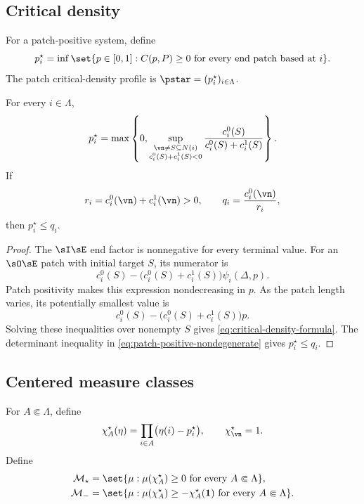 \subsection{Critical density}

\begin{definition}
\label{def:critical-profile}
For a patch-positive system, define
\[
  p_i^\star
  =
  \inf\set{
    p\in[0,1]:
    C(p,P)\ge0
    \text{ for every end patch based at }i
  }.
\]
The patch critical-density profile is
\(\pstar=(p_i^\star)_{i\in\Lambda}\).
\end{definition}

\begin{proposition}
\label{prop:critical-density-formula}
For every \(i\in\Lambda\),
\begin{equation}
  p_i^\star
  =
  \max\left\{
    0,
    \sup_{\substack{\vn\ne S\subseteq N(i)\\
                    c_i^0(S)+c_i^1(S)<0}}
    \frac{c_i^0(S)}{c_i^0(S)+c_i^1(S)}
  \right\}.
  \label{eq:critical-density-formula}
\end{equation}
If
\[
  r_i=c_i^0(\vn)+c_i^1(\vn)>0,
  \qquad
  q_i=\frac{c_i^0(\vn)}{r_i},
\]
then \(p_i^\star\le q_i\).
\end{proposition}

\begin{proof}
The \(\sI\sE\) end factor is nonnegative for every terminal value. For
an \(\sO\sE\) patch with initial target \(S\), its numerator is
\[
  c_i^0(S)
  -
  \bigl(c_i^0(S)+c_i^1(S)\bigr)\psi_i(\Delta,p).
\]
Patch positivity makes this expression nondecreasing in \(p\). As the
patch length varies, its potentially smallest value is
\[
  c_i^0(S)
  -
  \bigl(c_i^0(S)+c_i^1(S)\bigr)p.
\]
Solving these inequalities over nonempty \(S\) gives
\eqref{eq:critical-density-formula}. The determinant inequality in
\eqref{eq:patch-positive-nondegenerate} gives \(p_i^\star\le q_i\).
\end{proof}

\subsection{Centered measure classes}

\begin{definition}
\label{def:centered-classes}
For \(A\Subset\Lambda\), define
\begin{equation}
  \chi_A^\star(\eta)
  =
  \prod_{i\in A}\bigl(\eta(i)-p_i^\star\bigr),
  \qquad
  \chi_\vn^\star=1.
  \label{eq:centered-monomial}
\end{equation}
Define
\begin{align}
  \mathcal M_\star
  &=
  \set{
    \mu:
    \mu(\chi_A^\star)\ge0
    \text{ for every }A\Subset\Lambda
  },
  \label{eq:Mstar}
  \\
  \mathcal M_-
  &=
  \set{
    \mu:
    \mu(\chi_A^\star)
    \ge-\chi_A^\star(\mathbf1)
    \text{ for every }A\Subset\Lambda
  }.
  \label{eq:Mminus}
\end{align}
\end{definition}

